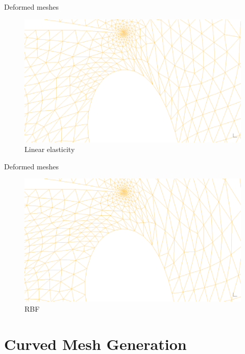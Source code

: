 \documentclass[mathserif]{beamer}
\begin{document}
\begin{frame}{Deformed meshes}
\begin{figure}
\includegraphics[scale=0.18]{movedwing-elast--60}
\caption{Linear elasticity}
\end{figure}
\end{frame}

\begin{frame}{Deformed meshes}
\begin{figure}
\includegraphics[scale=0.18]{movedwing-rbf--60}
\caption{RBF}
\end{figure}
\end{frame}

\section{Curved Mesh Generation}
\end{document}
